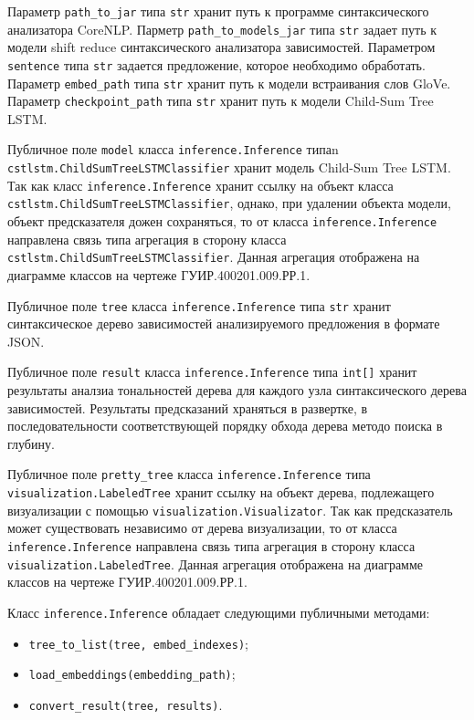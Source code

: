 Параметр \texttt{path\_to\_jar} типа \texttt{str} хранит путь к программе синтаксического анализатора CoreNLP\@. Парметр \texttt{path\_to\_models\_jar} типа \texttt{str} задает путь к модели shift reduce синтаксического анализатора зависимостей. Параметром \texttt{sentence} типа \texttt{str} задается предложение, которое необходимо обработать. Параметр \texttt{embed\_path} типа \texttt{str} хранит путь к модели встраивания слов GloVe. Параметр \texttt{checkpoint\_path} типа \texttt{str} хранит путь к модели Child-Sum Tree LSTM\@.

Публичное поле \texttt{model} класса \texttt{inference.Inference} типаn \texttt{cstlstm.ChildSumTreeLSTMClassifier} хранит модель Child-Sum Tree LSTM\@. Так как класс \texttt{inference.Inference} хранит ссылку на объект класса \texttt{cstlstm.ChildSumTreeLSTMClassifier}, однако, при удалении объекта модели, объект предсказателя дожен сохраняться, то от класса \texttt{inference.Inference} направлена связь типа агрегация в сторону класса \texttt{cstlstm.ChildSumTreeLSTMClassifier}. Данная агрегация отображена на диаграмме классов на чертеже ГУИР.400201.009.РР.1.

Публичное поле \texttt{tree} класса \texttt{inference.Inference} типа \texttt{str} хранит синтаксическое дерево зависимостей анализируемого предложения в формате JSON\@.

Публичное поле \texttt{result} класса \texttt{inference.Inference} типа \texttt{int[]} хранит результаты аналзиа тональностей дерева для каждого узла синтаксического дерева зависимостей. Результаты предсказаний храняться в развертке, в последовательности соответствующей порядку обхода дерева методо поиска в глубину.

Публичное поле \texttt{pretty\_tree} класса \texttt{inference.Inference} типа \texttt{visualization.LabeledTree} хранит ссылку на объект дерева, подлежащего визуализации с помощью \texttt{visualization.Visualizator}. Так как предсказатель может существовать независимо от дерева визуализации, то от класса \texttt{inference.Inference} направлена связь типа агрегация в сторону класса \texttt{visualization.LabeledTree}. Данная агрегация отображена на диаграмме классов на чертеже ГУИР.400201.009.РР.1.

Класс \texttt{inference.Inference} обладает следующими публичными методами:
\begin{itemize}
\item \texttt{tree\_to\_list(tree, embed\_indexes)};
\item \texttt{load\_embeddings(embedding\_path)};
\item \texttt{convert\_result(tree, results)}.
\end{itemize}


